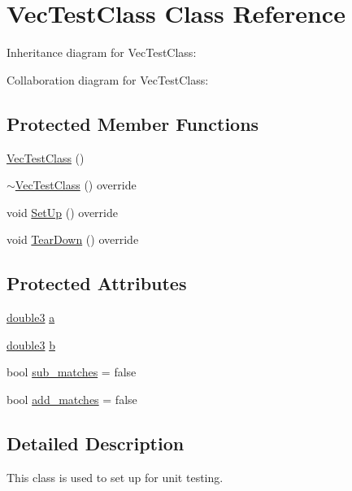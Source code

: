 \hypertarget{classVecTestClass}{}\section{Vec\+Test\+Class Class Reference}
\label{classVecTestClass}


Inheritance diagram for Vec\+Test\+Class\+:


Collaboration diagram for Vec\+Test\+Class\+:
\subsection*{Protected Member Functions}
\begin{DoxyCompactItemize}
\item 
\hyperlink{classVecTestClass_a295dc5627be30707d06487f57834ce74}{Vec\+Test\+Class} ()
\item 
\hyperlink{classVecTestClass_a8e28eaab728c672823abd1277410fd9b}{$\sim$\+Vec\+Test\+Class} () override
\item 
void \hyperlink{classVecTestClass_aaf193a57eca5d29ce68feefc54301f5a}{Set\+Up} () override
\item 
void \hyperlink{classVecTestClass_a876e182b56a6dbc0e2a57ef9c8654f2b}{Tear\+Down} () override
\end{DoxyCompactItemize}
\subsection*{Protected Attributes}
\begin{DoxyCompactItemize}
\item 
\hyperlink{Vec_8h_aca95f98e6008aee8e3744e99d7826608}{double3} \hyperlink{classVecTestClass_a0c9e5f7aa81909722402f90f5770f5b4}{a}
\item 
\hyperlink{Vec_8h_aca95f98e6008aee8e3744e99d7826608}{double3} \hyperlink{classVecTestClass_a98b58057e4571a8a96431f67678f6b97}{b}
\item 
bool \hyperlink{classVecTestClass_aa16462e2c2d464e46d3452b97e38940e}{sub\+\_\+matches} = false
\item 
bool \hyperlink{classVecTestClass_a1ec1005134c2c6ed2ca6dcec5ed40b2d}{add\+\_\+matches} = false
\end{DoxyCompactItemize}


\subsection{Detailed Description}
This class is used to set up for unit testing. 

